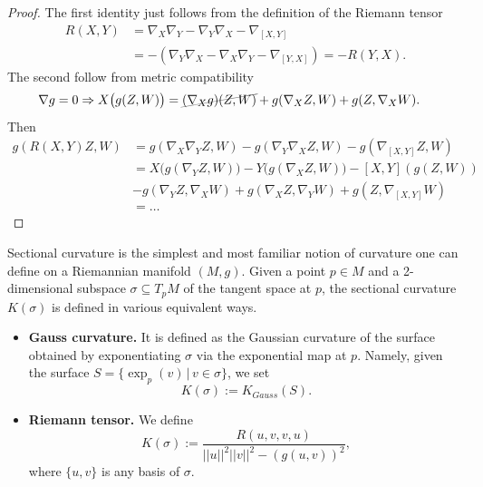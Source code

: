 \documentclass[../geometry_main.tex]{subfiles}
\begin{document}
\begin{proof}
The first identity just follows from the definition of the Riemann tensor 
\begin{align}
    R(X,Y) &= \nabla_X \nabla_Y - \nabla_Y \nabla_X - \nabla_{[X,Y]} \\
    & = - \left( \nabla_Y \nabla_X - \nabla_X \nabla_Y - \nabla_{[Y,X]} \right) = - R(Y,X).
\end{align}
The second follow from metric compatibility
\begin{align}
    \nabla g=0 &\Rightarrow X \big( g(Z,W) \big) = \graycancel{(\nabla_X g)(Z,W)}+ g(\nabla_X Z, W) + g(Z, \nabla_X W).
\end{align}
Then 
\begin{align}
    g(R(X,Y)Z,W) &= g(\nabla_X \nabla_Y Z, W) - g(\nabla_Y \nabla_X Z, W) - g(\nabla_{[X,Y]} Z, W)
    \\
    & = X \big( g(\nabla_Y Z, W) \big) - Y \big( g(\nabla_X Z, W) \big) - [X,Y]( g(Z, W)) \\
    & - g(\nabla_Y Z, \nabla_X W) + g(\nabla_X Z, \nabla_Y W) + g(Z, \nabla_{[X,Y]} W) \\
    & = \dots
\end{align}

\end{proof}



\begin{mytheorem}
Sectional curvature is the simplest and most familiar notion of curvature one can define on a Riemannian manifold \((M,g)\).
Given a point \(p \in M\) and a 2-dimensional subspace \(\sigma \subseteq T_p M\) of the tangent space at \(p\), the sectional curvature \(K(\sigma)\) is defined in various equivalent ways.
\begin{itemize}
    \item \textbf{Gauss curvature.}  It is defined as the Gaussian curvature of the surface obtained by exponentiating \(\sigma\) via the exponential map at \(p\).
    Namely, given the surface $S = \{\exp_p (v) \,|\, v \in \sigma \}$, we set
    \begin{equation}
        K(\sigma) := K_{Gauss} (S).
    \end{equation}
    \item \textbf{Riemann tensor.}  We define
    \begin{equation}
        K(\sigma) := \frac{R(u,v,v,u)}{||u||^2 ||v||^2 - (g(u,v))^2},
    \end{equation}
    where \(\{u,v\}\) is any basis of \(\sigma\).
\end{itemize}
\end{mytheorem}
\end{document}
